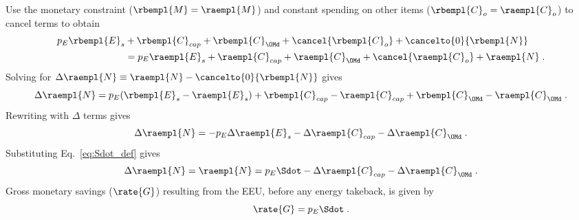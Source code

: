 \begin{landscape}
{Use the monetary constraint ($\rbempl{M} = \raempl{M}$)
and constant spending on other items ($\rbempl{C}_o = \raempl{C}_o$) to cancel terms to obtain
%
\begin{align}
  p_E \rbempl{E}_s &+ \rbempl{C}_{cap} + \rbempl{C}_{\OMd} + \cancel{\rbempl{C}_o} + \cancelto{0}{\rbempl{N}} \nonumber \\
                   &= p_E \raempl{E}_s + \raempl{C}_{cap} + \raempl{C}_{\OMd} + \cancel{\raempl{C}_o}  + \raempl{N} \; .
\end{align}
%
Solving for $\Delta \raempl{N} \equiv \raempl{N} - \cancelto{0}{\rbempl{N}}$ gives 
%
\begin{equation}
  \Delta \raempl{N} = p_E(\rbempl{E}_s - \raempl{E}_s) 
                      + \rbempl{C}_{cap} - \raempl{C}_{cap}
                      + \rbempl{C}_{\OMd} - \raempl{C}_{\OMd} \; .
\end{equation}
%
Rewriting with $\Delta$ terms gives
%
\begin{equation}
  \Delta \raempl{N} = - p_E \Delta \raempl{E}_s - \Delta \raempl{C}_{cap} - \Delta \raempl{C}_{\OMd} \; .
\end{equation}
%
Substituting Eq.~\ref{eq:Sdot_def} gives
%
\begin{equation}
  \Delta \raempl{N} = \raempl{N} = p_E \Sdot - \Delta \raempl{C}_{cap} - \Delta \raempl{C}_{\OMd} \; .
\end{equation}
%
Gross monetary savings ($\rate{G}$) resulting from the EEU, 
before any energy takeback, is given by 
%
\begin{equation} \label{eq:G_dot}
  \rate{G} = p_E \Sdot \; .
\end{equation}
}

\end{landscape}
